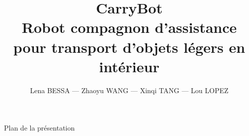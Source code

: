 \documentclass[10pt,aspectratio=169]{beamer}
\title{\textbf{CarryBot}\\\large Robot compagnon d’assistance pour transport d’objets légers en intérieur}
\author{Lena BESSA — Zhaoyu WANG — Xinqi TANG — Lou LOPEZ}
\institute{Master 2 MIASHS — Technologie \& Handicap\\Université Paris 8}
\begin{document}

\begin{frame}
    \titlepage
\end{frame}


\begin{frame}{Plan de la présentation}
    \tableofcontents
\end{frame}


\end{document}
